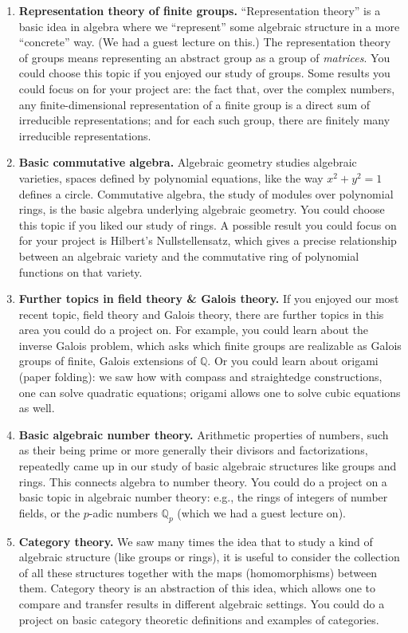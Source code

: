 \documentclass[11pt]{article}
\begin{document}
\begin{enumerate}

\item {\bf Representation theory of finite groups.} ``Representation theory'' is a basic idea in algebra where we ``represent'' some algebraic structure in a more ``concrete'' way. (We had a guest lecture on this.) The representation theory of groups means representing an abstract group as a group of \emph{matrices}. You could choose this topic if you enjoyed our study of groups. Some results you could focus on for your project are: the fact that, over the complex numbers, any finite-dimensional representation of a finite group is a direct sum of irreducible representations; and for each such group, there are finitely many irreducible representations.

\item {\bf Basic commutative algebra.} Algebraic geometry studies algebraic varieties, spaces defined by polynomial equations, like the way $x^2+y^2=1$ defines a circle. Commutative algebra, the study of modules over polynomial rings, is the basic algebra underlying algebraic geometry. You could choose this topic if you liked our study of rings. A possible result you could focus on for your project is Hilbert's Nullstellensatz, which gives a precise relationship between an algebraic variety and the commutative ring of polynomial functions on that variety.

\item {\bf Further topics in field theory \& Galois theory.} If you enjoyed our most recent topic, field theory and Galois theory, there are further topics in this area you could do a project on. For example, you could learn about the inverse Galois problem, which asks which finite groups are realizable as Galois groups of finite, Galois extensions of $\mathbb{Q}$. Or you could learn about origami (paper folding): we saw how with compass and straightedge constructions, one can solve quadratic equations; origami allows one to solve cubic equations as well.

\item {\bf Basic algebraic number theory.} Arithmetic properties of numbers, such as their being prime or more generally their divisors and factorizations, repeatedly came up in our study of basic algebraic structures like groups and rings. This connects algebra to number theory. You could do a project on a basic topic in algebraic number theory: e.g., the rings of integers of number fields, or the $p$-adic numbers $\mathbb{Q}_p$ (which we had a guest lecture on).

\item {\bf Category theory.} We saw many times the idea that to study a kind of algebraic structure (like groups or rings), it is useful to consider the collection of all these structures together with the maps (homomorphisms) between them. Category theory is an abstraction of this idea, which allows one to compare and transfer results in different algebraic settings. You could do a project on basic category theoretic definitions and examples of categories.

\end{enumerate}
\end{document}
